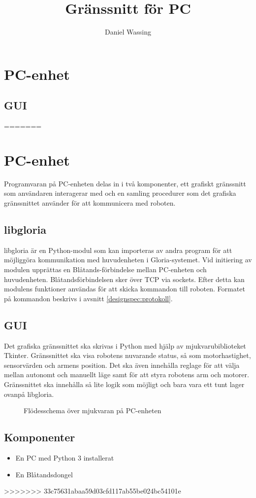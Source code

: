 \documentclass[10pt,a4paper]{article}
\title{Gränssnitt för PC}
\author{Daniel Wassing}
\begin{document}
\section{PC-enhet}
	\subsection{GUI}

	\centerline{}

	
=======
\section{PC-enhet}
Programvaran på PC-enheten delas in i två komponenter, ett grafiskt gränssnitt som användaren interagerar med och en samling procedurer som det grafiska gränssnittet använder för att kommunicera med roboten. 

\subsection{libgloria}
libgloria är en Python-modul som kan importeras av andra program för att möjliggöra kommunikation med huvudenheten i Gloria-systemet. Vid initiering av modulen upprättas en Blåtands-förbindelse mellan PC-enheten och huvudenheten. Blåtandsförbindelsen sker över TCP via sockets. Efter detta kan modulens funktioner användas för att skicka kommandon till roboten. Formatet på kommandon beskrivs i avsnitt \ref{designspec:protokoll}.

\subsection{GUI}
Det grafiska gränssnittet ska skrivas i Python med hjälp av mjukvarubiblioteket Tkinter. Gränssnittet ska visa robotens nuvarande status, så som motorhastighet, sensorvärden och armens position. Det ska även innehålla reglage för att välja mellan autonomt och manuellt läge samt för att styra robotens arm och motorer. Gränssnittet ska innehålla så lite logik som möjligt och bara vara ett tunt lager ovanpå libgloria.

\begin{figure}[h]
  \centerline{\scalebox{0.8}{}}
  \caption{Flödesschema över mjukvaran på PC-enheten}
\end{figure}

\subsection{Komponenter}
\begin{itemize}
\item En PC med Python 3 installerat
\item En Blåtandsdongel
\end{itemize}
>>>>>>> 33c75631abaa59d03cfd117ab55be024bc54101e
\end{document}
